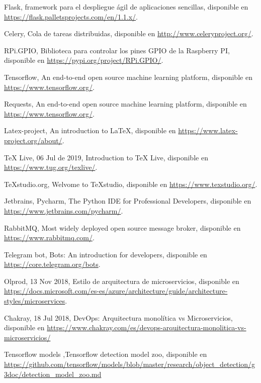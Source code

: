\begin{thebibliography}{99}
	 Flask, framework para el despliegue ágil de aplicaciones sencillas, disponible en \url{https://flask.palletsprojects.com/en/1.1.x/}.
	
	 Celery, Cola de tareas distribuidas, disponible en \url{http://www.celeryproject.org/}.
	
	 RPi.GPIO, Biblioteca para controlar los pines GPIO de la Raspberry PI, disponible en \url{https://pypi.org/project/RPi.GPIO/}.
	
	 Tensorflow, An end-to-end open source machine learning platform, disponible en \url{https://www.tensorflow.org/}.
	
	 Requests, An end-to-end open source machine learning platform, disponible en \url{https://www.tensorflow.org/}.
	
	 Latex-project, An introduction to LaTeX, disponible en \url{https://www.latex-project.org/about/}.

	 TeX Live, 06 Jul de 2019, Introduction to TeX Live, disponible en \url{https://www.tug.org/texlive/}.
	
	 TeXstudio.org, Welvome to TeXstudio, disponible en \url{https://www.texstudio.org/}.

	 Jetbrains, Pycharm, The Python IDE
	for Professional Developers, disponible en \url{https://www.jetbrains.com/pycharm/}.
	
	 RabbitMQ, Most widely deployed open source message broker, disponible en \url{https://www.rabbitmq.com/}.
	
	 Telegram bot, Bots: An introduction for developers, disponible en \url{https://core.telegram.org/bots}.
	
	 Olprod, 13 Nov 2018, Estilo de arquitectura de microservicios, disponible en \url{https://docs.microsoft.com/es-es/azure/architecture/guide/architecture-styles/microservices}.

	 Chakray, 18 Jul 2018, DevOps: Arquitectura monolítica vs Microservicios, disponible en \url{https://www.chakray.com/es/devops-arquitectura-monolitica-vs-microservicios/}
	
	 Tensorflow models ,Tensorflow detection model zoo, disponible en \url{https://github.com/tensorflow/models/blob/master/research/object_detection/g3doc/detection_model_zoo.md}
	
\end{thebibliography}